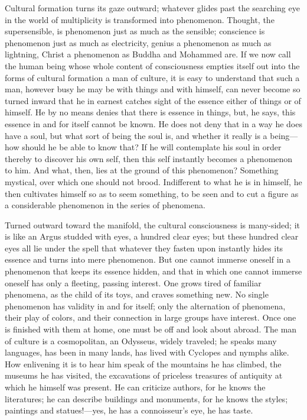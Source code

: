\documentclass[12pt,a4paper,openany]{book}
\newcommand{\opage}[1]{\marginnote{\footnotesize\textit{[#1]}}}
\begin{document}
\opage{2}Cultural formation turns its gaze outward; whatever glides past the
searching eye in the world of multiplicity is transformed into
phenomenon. Thought, the supersensible, is phenomenon just as much as the
sensible; conscience is phenomenon just as much as electricity, genius a
phenomenon as much as lightning, Christ a phenomenon as Buddha and
Mohammed are. If we now call the human being whose whole content of
consciousness empties itself out into the forms of cultural formation a
man of culture, it is easy to understand that such a man, however busy he
may be with things and with himself, can never become so turned inward
that he in earnest catches sight of the essence either of things or of
himself. He by no means denies that there is essence in things, but, he
says, this essence in and for itself cannot be known. He does not deny
that in a way he does have a soul, but what sort of being the soul is,
and whether it really is a being---how should he be able to know that? If
he will contemplate his soul in order thereby to discover his own self,
then this self instantly becomes a phenomenon to him. And what, then,
lies at the ground of this phenomenon? Something mystical, over which one
should not brood. Indifferent to what he is in himself, he then
cultivates himself so as to seem something, to be seen and to cut a
figure as a considerable phenomenon in the series of phenomena.

Turned outward toward the manifold, the cultural consciousness is
many-sided; it is like an Argus studded with eyes, a hundred clear eyes;
but these hundred clear eyes all lie under the spell that whatever they
fasten upon instantly hides its essence and turns into mere phenomenon.
But one cannot immerse oneself in a phenomenon that keeps its essence
hidden, and \opage{3}that in which one cannot immerse oneself has only a fleeting,
passing interest. One grows tired of familiar phenomena, as the child of
its toys, and craves something new. No single phenomenon has validity in
and for itself; only the alternation of phenomena, their play of colors,
and their connection in large groups have interest. Once one is finished
with them at home, one must be off and look about abroad. The man of
culture is a cosmopolitan, an Odysseus, widely traveled; he speaks many
languages, has been in many lands, has lived with Cyclopes and nymphs
alike. How enlivening it is to hear him speak of the mountains he has
climbed, the museums he has visited, the excavations of priceless
treasures of antiquity at which he himself was present. He can criticize
authors, for he knows the literatures; he can describe buildings and
monuments, for he knows the styles; paintings and statues!---yes, he has
a connoisseur's eye, he has taste.
\end{document}
